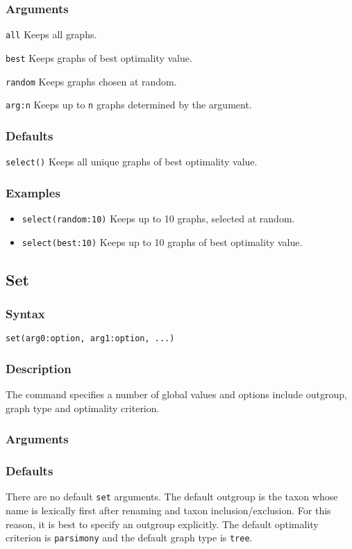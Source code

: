 \documentclass[11pt]{article}
\begin{document}
		\subsubsection{Arguments}
			\noindent \texttt{all} Keeps all graphs.
		
			\smallskip		
			\noindent	\noindent \texttt{best} Keeps graphs of best optimality value.
			
			\smallskip		
			\noindent \texttt{random} Keeps graphs chosen at random.
			
			\smallskip		
			\noindent \texttt{arg:n} Keeps up to \texttt{n} graphs determined by the argument.
		\subsubsection{Defaults}
			\texttt{select()} Keeps all unique graphs of best optimality value.
		\subsubsection{Examples}
				\begin{itemize}
					\item{\texttt{select(random:10)} Keeps up to 10 graphs, selected at random.}
					\item{\texttt{select(best:10)} Keeps up to 10 graphs of best optimality value.}
			\end{itemize}
	\subsection{Set}
		\subsubsection{Syntax}
				\texttt{set(arg0:option, arg1:option, ...)}
		\subsubsection{Description}
		The command specifies a number of global values and options include outgroup, graph type and optimality criterion.
		\subsubsection{Arguments}
		\subsubsection{Defaults}
		There are no default \texttt{set} arguments.  The default outgroup is the taxon whose name  is lexically first after
		renaming and taxon inclusion/exclusion. For this reason, it is best to specify an outgroup explicitly.
		The default optimality criterion is \texttt{parsimony} and the default graph type is \texttt{tree}.
\end{document}
